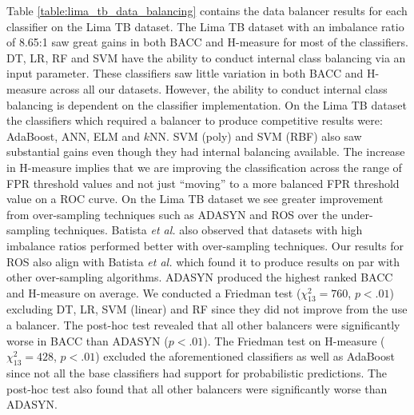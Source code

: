 \documentclass{sig-alternate-05-2015}
\begin{document}
	Table \ref{table:lima_tb_data_balancing} contains the data balancer results for each classifier on the Lima TB dataset. The Lima TB dataset with an imbalance ratio of 8.65:1 saw great gains in both BACC and H-measure for most of the classifiers. DT, LR, RF and SVM have the ability to conduct internal class balancing via an input parameter. These classifiers saw little variation in both BACC and H-measure across all our datasets. However, the ability to conduct internal class balancing is dependent on the classifier implementation. On the Lima TB dataset the classifiers which required a balancer to produce competitive results were: AdaBoost, ANN, ELM and $k$NN. SVM (poly) and SVM (RBF) also saw substantial gains even though they had internal balancing available. The increase in H-measure implies that we are improving the classification across the range of FPR threshold values and not just ``moving'' to a more balanced FPR threshold value on a ROC curve. On the Lima TB dataset we see greater improvement from over-sampling techniques such as ADASYN and ROS over the under-sampling techniques. Batista \textit{et al.} \cite{Batista:2004:SBS:1007730.1007735} also observed that datasets with high imbalance ratios performed better with over-sampling techniques. Our results for ROS also align with Batista \textit{et al.} \cite{Batista:2004:SBS:1007730.1007735} which found it to produce results on par with other over-sampling algorithms. ADASYN produced the highest ranked BACC and H-measure on average.  We conducted a Friedman test ($\chi^2_{13}=760$, $p<.01$) excluding DT, LR, SVM (linear) and RF since they did not improve from the use a balancer. The post-hoc test revealed that all other balancers were significantly worse in BACC than ADASYN ($p<.01$). The Friedman test on H-measure ($\chi^2_{13}=428$, $p<.01$) excluded the aforementioned classifiers as well as AdaBoost since not all the base classifiers had support for probabilistic predictions. The post-hoc test also found that all other balancers were significantly worse than ADASYN. 
	
\end{document}
